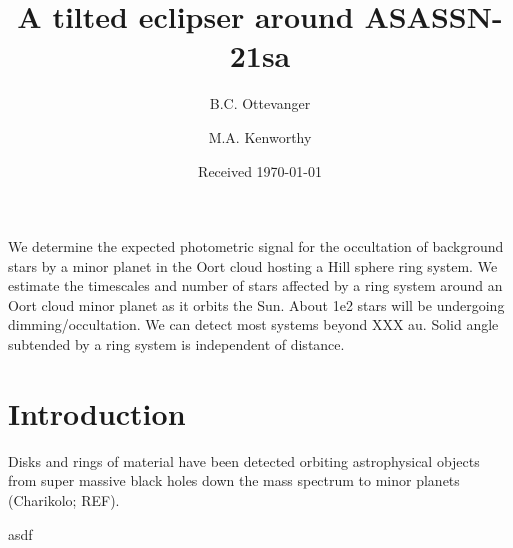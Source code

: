 \documentclass[]{aa} %
\begin{document}
   \title{A tilted eclipser around ASASSN-21sa}

   \author{B.C. Ottevanger \and 
   M.A. Kenworthy
          }
             
   \date{Received \today}

 
  \abstract
  {}  
   {We determine the expected photometric signal for the occultation of background stars by a minor planet in the Oort cloud hosting a Hill sphere ring system.}
   {We estimate the timescales and number of stars affected by a ring system around an Oort cloud minor planet as it orbits the Sun.}
   {About 1e2 stars will be undergoing dimming/occultation. We can detect most systems beyond XXX au.
   Solid angle subtended by a ring system is independent of distance.
   }
   {}


   \maketitle
%

\section{Introduction}\label{sec:intro}

Disks and rings of material have been detected orbiting astrophysical objects from super massive black holes down the mass spectrum to minor planets (Charikolo; REF).


asdf

\end{document}
